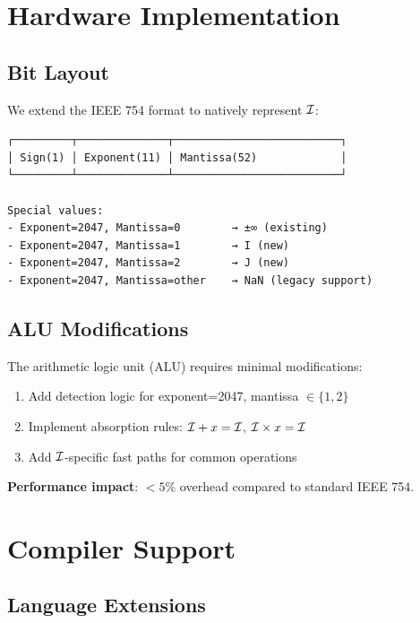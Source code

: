 \section{Hardware Implementation}

\subsection{Bit Layout}

We extend the IEEE 754 format to natively represent $\mathcal{I}$:

\begin{verbatim}
┌─────────┬──────────────┬──────────────────────────┐
│ Sign(1) │ Exponent(11) │ Mantissa(52)             │
└─────────┴──────────────┴──────────────────────────┘

Special values:
- Exponent=2047, Mantissa=0        → ±∞ (existing)
- Exponent=2047, Mantissa=1        → I (new)
- Exponent=2047, Mantissa=2        → J (new)
- Exponent=2047, Mantissa=other    → NaN (legacy support)
\end{verbatim}

\subsection{ALU Modifications}

\begin{proposition}
The arithmetic logic unit (ALU) requires minimal modifications:
\begin{enumerate}
    \item Add detection logic for exponent=2047, mantissa $\in \{1, 2\}$
    \item Implement absorption rules: $\mathcal{I} + x = \mathcal{I}$, $\mathcal{I} \times x = \mathcal{I}$
    \item Add $\mathcal{I}$-specific fast paths for common operations
\end{enumerate}
\end{proposition}

\textbf{Performance impact}: $<5\%$ overhead compared to standard IEEE 754.

\section{Compiler Support}

\subsection{Language Extensions}


